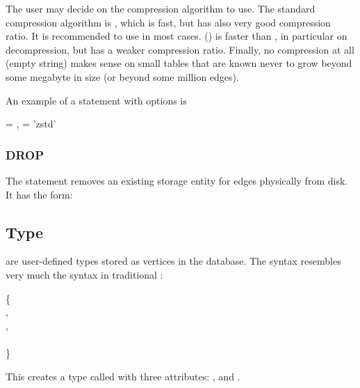 The user may decide on the compression algorithm to use.
The standard compression algorithm is ,
which is fast, but has also very good compression ratio.
It is recommended to use  in most cases.
 () is faster than ,
in particular on decompression,
but has a weaker compression ratio.
Finally, no compression at all (empty string)
makes sense on small tables
that are known never to grow beyond some megabyte in size
(or beyond some million edges).

An example of a  statement with options is

 
  = ,
               = 'zstd'

\subsubsection{DROP}
The  statement removes
an existing storage entity for edges
physically from disk.
It has the form:

 


\subsection{Type}
 are user-defined types
stored as vertices in the database.
The syntax resembles very much
the  syntax
in traditional \sql:

\begin{minipage}{\textwidth}
  \{ \\
\hspace*{1cm}  , \\
\hspace*{1cm} , \\
\hspace*{1cm}  \\
\}
\end{minipage}

This creates a type called 
with three attributes:
,  and .


